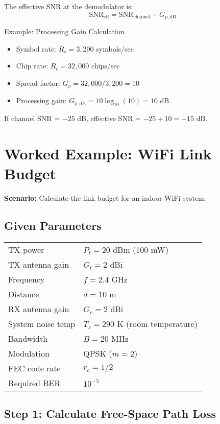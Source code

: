 The effective SNR at the demodulator is:
\begin{equation}
\mathrm{SNR}_{\mathrm{eff}} = \mathrm{SNR}_{\mathrm{channel}} + G_{p,\mathrm{dB}}
\end{equation}

\begin{calloutbox}{Example: Processing Gain Calculation}
\begin{itemize}
\item Symbol rate: $R_s = 3{,}200$ symbols/sec
\item Chip rate: $R_c = 32{,}000$ chips/sec
\item Spread factor: $G_p = 32{,}000 / 3{,}200 = 10$
\item Processing gain: $G_{p,\mathrm{dB}} = 10\log_{10}(10) = 10$ dB
\end{itemize}

If channel SNR = $-25$ dB, effective SNR = $-25 + 10 = -15$ dB.
\end{calloutbox}

\section{Worked Example: WiFi Link Budget}

\textbf{Scenario:} Calculate the link budget for an indoor WiFi system.

\subsection*{Given Parameters}

\begin{tabular}{@{}ll@{}}
TX power & $P_t = 20$ dBm (100 mW) \\
TX antenna gain & $G_t = 2$ dBi \\
Frequency & $f = 2.4$ GHz \\
Distance & $d = 10$ m \\
RX antenna gain & $G_r = 2$ dBi \\
System noise temp & $T_s = 290$ K (room temperature) \\
Bandwidth & $B = 20$ MHz \\
Modulation & QPSK ($m = 2$) \\
FEC code rate & $r_c = 1/2$ \\
Required BER & $10^{-5}$ \\
\end{tabular}

\subsection*{Step 1: Calculate Free-Space Path Loss}

